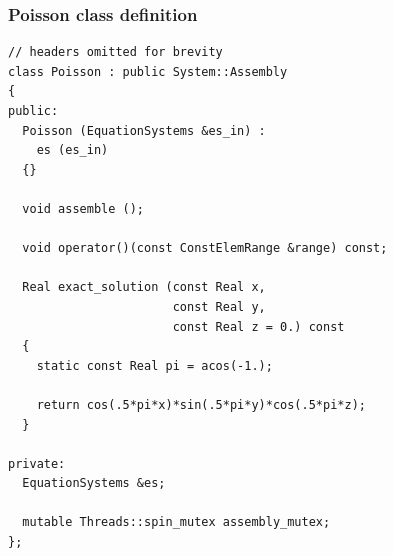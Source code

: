 \begin{frame}
  \frametitle{Poisson class definition}

  \begin{lstlisting}
// headers omitted for brevity
class Poisson : public System::Assembly
{
public:
  Poisson (EquationSystems &es_in) :
    es (es_in)
  {}

  void assemble ();

  void operator()(const ConstElemRange &range) const;

  Real exact_solution (const Real x,
                       const Real y,
                       const Real z = 0.) const
  {
    static const Real pi = acos(-1.);

    return cos(.5*pi*x)*sin(.5*pi*y)*cos(.5*pi*z);
  }

private:
  EquationSystems &es;

  mutable Threads::spin_mutex assembly_mutex;
};
  \end{lstlisting}
\end{frame}



